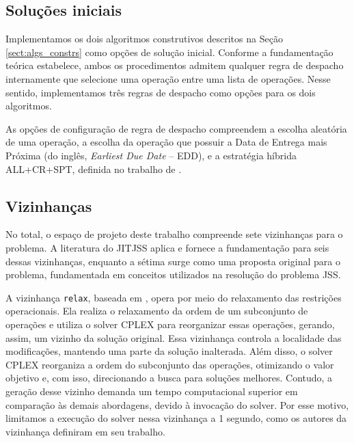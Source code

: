 \subsection{Soluções iniciais}

Implementamos os dois algoritmos construtivos descritos na Seção \ref{sect:algs_constrs} como opções de solução inicial. Conforme a fundamentação teórica estabelece, ambos os procedimentos admitem qualquer regra de despacho internamente que selecione uma operação entre uma lista de operações. Nesse sentido, implementamos três regras de despacho como opções para os dois algoritmos.

As opções de configuração de regra de despacho compreendem a escolha aleatória de uma operação, a escolha da operação que possuir a Data de Entrega mais Próxima (do inglês, \textit{Earliest Due Date} -- \acs{EDD}), e a estratégia híbrida ALL+CR+SPT, definida no trabalho de \cite{wang2014variable}.

\subsection{Vizinhanças}

No total, o espaço de projeto deste trabalho compreende sete vizinhanças para o problema. A literatura do \ac{JITJSS} aplica e fornece a fundamentação para seis dessas vizinhanças, enquanto a sétima surge como uma proposta original para o problema, fundamentada em conceitos utilizados na resolução do problema \ac{JSS}.

A vizinhança \texttt{relax}, baseada em \cite{ahmadian2021meta}, opera por meio do relaxamento das restrições operacionais. Ela realiza o relaxamento da ordem de um subconjunto de operações e utiliza o solver CPLEX para reorganizar essas operações, gerando, assim, um vizinho da solução original. Essa vizinhança controla a localidade das modificações, mantendo uma parte da solução inalterada. Além disso, o solver CPLEX reorganiza a ordem do subconjunto das operações, otimizando o valor objetivo e, com isso, direcionando a busca para soluções melhores. Contudo, a geração desse vizinho demanda um tempo computacional superior em comparação às demais abordagens, devido à invocação do solver. Por esse motivo, limitamos a execução do solver nessa vizinhança a 1 segundo, como os autores da vizinhança definiram em seu trabalho.

